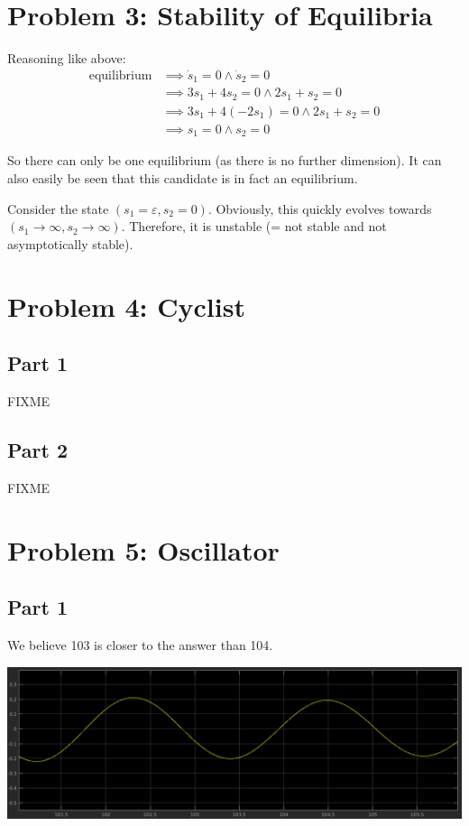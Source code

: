 \documentclass[a4paper,parskip,headheight=38pt]{scrartcl} %
\begin{document}
\section*{Problem 3: Stability of Equilibria}

Reasoning like above:
\begin{align*}
    \text{equilibrium}
    &\implies \dot{s}_1 = 0 \land \dot{s}_2 = 0 \\
    &\implies 3s_1 + 4s_2 = 0 \land 2s_1 + s_2 = 0 \\
    &\implies 3s_1 + 4(-2s_1) = 0 \land 2s_1 + s_2 = 0 \\
    &\implies s_1 = 0 \land s_2 = 0
\end{align*}

So there can only be one equilibrium (as there is no further
dimension).  It can also easily be seen that this candidate is in fact
an equilibrium.

Consider the state $(s_1=\varepsilon, s_2 = 0)$.  Obviously, this
quickly evolves towards $(s_1 \to \infty, s_2 \to \infty)$.  Therefore,
it is unstable (= not stable and not asymptotically stable).


\section*{Problem 4: Cyclist}

\subsection*{Part 1}

FIXME

\subsection*{Part 2}

FIXME


\section*{Problem 5: Oscillator}

\subsection*{Part 1}

We believe 103 is closer to the answer than 104.

\includegraphics[width=\textwidth]{p5-proof}
\end{document}
